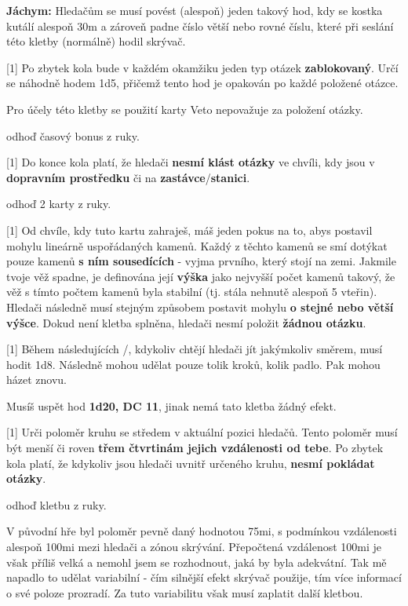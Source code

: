\begin{cards}
\begin{reasoning}
		\textbf{Jáchym:} Hledačům se musí povést (alespoň) jeden takový hod, kdy se kostka kutálí alespoň 30m a zároveň padne číslo větší nebo rovné číslu, které při seslání této kletby (normálně) hodil skrývač.
	\end{reasoning}

	 Po zbytek kola bude v každém okamžiku jeden typ otázek \textbf{zablokovaný}. Určí se náhodně hodem 1d5, přičemž tento hod je opakován po každé položené otázce.

	Pro účely této kletby se použití karty Veto nepovažuje za položení otázky.

	\cost odhoď časový bonus z ruky.

	 Do konce kola platí, že hledači \textbf{nesmí klást otázky} ve chvíli, kdy jsou v \textbf{dopravním prostředku} či na \textbf{zastávce}/\textbf{stanici}.

	\cost odhoď 2 karty z ruky.

	 Od chvíle, kdy tuto kartu zahraješ, máš jeden pokus na to, abys postavil mohylu lineárně uspořádaných kamenů. Každý z těchto kamenů se smí dotýkat pouze kamenů \textbf{s ním sousedících} - vyjma prvního, který stojí na zemi. Jakmile tvoje věž spadne, je definována její \textbf{výška} jako nejvyšší počet kamenů takový, že věž s tímto počtem kamenů byla stabilní (tj. stála nehnutě alespoň 5 vteřin). Hledači následně musí stejným způsobem postavit mohylu \textbf{o stejné nebo větší výšce}. Dokud není kletba splněna, hledači nesmí položit \textbf{žádnou otázku}.

	 Během následujících \timecursegambler/, kdykoliv chtějí hledači jít jakýmkoliv směrem, musí hodit 1d8. Následně mohou udělat pouze tolik kroků, kolik padlo. Pak mohou házet znovu.

	\cost Musíš uspět hod \textbf{1d20, DC 11}, jinak nemá tato kletba žádný efekt.

	 Urči poloměr kruhu se středem v aktuální pozici hledačů. Tento poloměr musí být menší či roven \textbf{třem čtvrtinám jejich vzdálenosti od tebe}. Po zbytek kola platí, že kdykoliv jsou hledači uvnitř určeného kruhu, \textbf{nesmí pokládat otázky}.

	\cost odhoď kletbu z ruky.

	\begin{reasoning}
		V původní hře byl poloměr pevně daný hodnotou 75mi, s podmínkou vzdálenosti alespoň 100mi mezi hledači a zónou skrývání. Přepočtená vzdálenost \dist100mi je však příliš velká a nemohl jsem se rozhodnout, jaká by byla adekvátní. Tak mě napadlo to udělat variabilní - čím silnější efekt skrývač použije, tím více informací o své poloze prozradí. Za tuto variabilitu však musí zaplatit další kletbou.
	\end{reasoning}


\end{cards}
